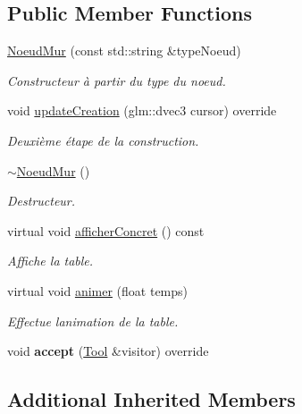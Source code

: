 \subsection*{Public Member Functions}
{\bf }\par
\begin{DoxyCompactItemize}
\item 
\hyperlink{class_noeud_mur_aeab2deec90548c0bdca5eb86beb629cf}{Noeud\+Mur} (const std\+::string \&type\+Noeud)
\begin{DoxyCompactList}\small\item\em Constructeur à partir du type du noeud. \end{DoxyCompactList}\item 
void \hyperlink{class_noeud_mur_a9f86d3ce3675f79abe879143e6dd4e8b}{update\+Creation} (glm\+::dvec3 cursor) override
\begin{DoxyCompactList}\small\item\em Deuxième étape de la construction. \end{DoxyCompactList}\item 
\hyperlink{class_noeud_mur_a169060e04a6423e7f025d475afd7d9ea}{$\sim$\+Noeud\+Mur} ()
\begin{DoxyCompactList}\small\item\em Destructeur. \end{DoxyCompactList}\item 
virtual void \hyperlink{class_noeud_mur_a521a3062875ea6ed1645485412a70c7b}{afficher\+Concret} () const 
\begin{DoxyCompactList}\small\item\em Affiche la table. \end{DoxyCompactList}\item 
virtual void \hyperlink{class_noeud_mur_a416be055b332d2434106868d6fad7059}{animer} (float temps)
\begin{DoxyCompactList}\small\item\em Effectue l\textquotesingle{}animation de la table. \end{DoxyCompactList}\item 
\hypertarget{class_noeud_mur_a267fe3fba8110e59fa76412f788ea8d1}{}void {\bfseries accept} (\hyperlink{class_tool}{Tool} \&visitor) override\label{class_noeud_mur_a267fe3fba8110e59fa76412f788ea8d1}

\end{DoxyCompactItemize}

\subsection*{Additional Inherited Members}


